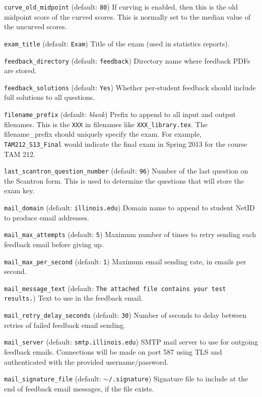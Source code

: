 \documentclass{article}
\begin{document}
\hangindent=1cm \texttt{curve_old_midpoint} (default: \texttt{80}) If
curving is enabled, then this is the old midpoint score of the curved
scores. This is normally set to the median value of the uncurved
scores.

\hangindent=1cm \texttt{exam_title} (default: \texttt{Exam}) Title of
the exam (used in statistics reports).

\hangindent=1cm \texttt{feedback_directory} (default:
\texttt{feedback}) Directory name where feedback PDFs are stored.

\hangindent=1cm \texttt{feedback_solutions} (default: \texttt{Yes})
Whether per-student feedback should include full solutions to all
questions.

\hangindent=1cm \texttt{filename_prefix} (default: \emph{blank})
Prefix to append to all input and output filenames. This is the
\texttt{XXX} in filenames like \texttt{XXX_library.tex}.  The
filename_prefix should uniquely specify the exam. For example,
\texttt{TAM212_S13_Final} would indicate the final exam in Spring 2013
for the course TAM 212.

\hangindent=1cm \texttt{last_scantron_question_number} (default:
\texttt{96}) Number of the last question on the Scantron form. This is
used to determine the questions that will store the exam key.

\hangindent=1cm \texttt{mail_domain} (default: \texttt{illinois.edu})
Domain name to append to student NetID to produce email addresses.

\hangindent=1cm \texttt{mail_max_attempts} (default: \texttt{5})
Maximum number of times to retry sending each feedback email before
giving up.

\hangindent=1cm \texttt{mail_max_per_second} (default: \texttt{1})
Maximum email sending rate, in emails per second.

\hangindent=1cm \texttt{mail_message_text} (default: \texttt{The
  attached file contains your test results.}) Text to use in the
feedback email.

\hangindent=1cm \texttt{mail_retry_delay_seconds} (default:
\texttt{30}) Number of seconds to delay between retries of failed
feedback email sending.

\hangindent=1cm \texttt{mail_server} (default:
\texttt{smtp.illinois.edu}) SMTP mail server to use for outgoing
feedback emails.  Connections will be made on port 587 using TLS and
authenticated with the provided username/password.

\hangindent=1cm \texttt{mail_signature_file} (default:
\texttt{$\sim$/.signature}) Signature file to include at the end of
feedback email messages, if the file exists.
\end{document}

